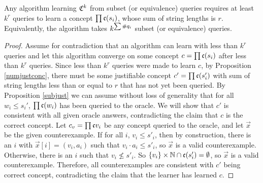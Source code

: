\begin{theorem}
Any algorithm learning $\mathfrak{C}^k$ from subset (or equivalence) queries requires at least $k^r$ queries to learn a concept $\prod \mathfrak{c}(s_i)$, whose sum of string lengths is $r$.
Equivalently, the algorithm takes $k^{\sum \#q_{i}}$ subset (or equivalence) queries.
\end{theorem}
\begin{proof}
Assume for contradiction that an algorithm can learn with less than $k^r$ queries and let this algorithm converge on some concept $c = \prod \mathfrak{c}(s_i)$ after less than $k^r$ queries.
Since less than $k^r$ queries were made to learn $c$, by Proposition \ref{numjustconc}, there must be some justifiable concept $c' = \prod \mathfrak{c}(s'_i)$ with sum of string lengths less than or equal to $r$ that has not yet been queried.
By Proposition \ref{subjust} we can assume without loss of generality that for all $w_i \le s_i'$, $\prod \mathfrak{c}(w_i)$ has been queried to the oracle.
We will show that $c'$ is consistent with all given oracle answers, contradicting the claim that $c$ is the correct concept. 
Let $c_v = \prod \mathfrak{c}{v_i}$ be any concept queried to the oracle, and let $\vec{x}$ be the given counterexample.
If for all $i$, $v_i \le s'_i$, then by construction, there is an $i$ with $\vec{x}[i] = (v_i, a_i)$ such that $v_i \cdot a_i \le s'_i$, so $\vec{x}$ is a valid counterexample.
Otherwise, there is an $i$ such that $v_i \not\le s'_i$. 
So $\{v_i\} \times \mathbb{N}  \cap \mathfrak{c}(s'_i) = \emptyset$, so $\vec{x}$ is a valid counterexample. 
Therefore, all counterexamples are consistent with $c'$ being correct concept, contradicting the claim that the learner has learned $c$. 
\end{proof}







